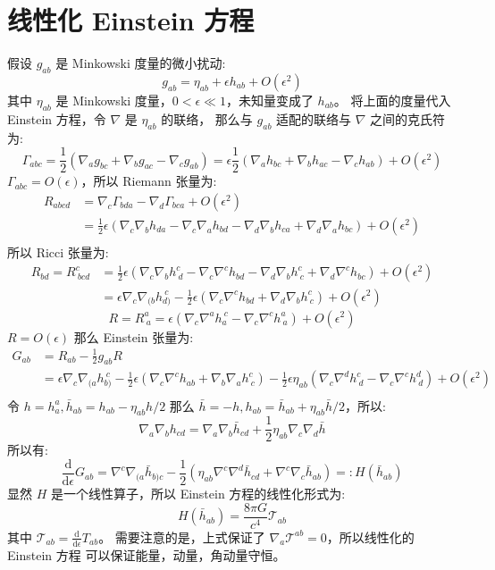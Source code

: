 \documentclass[lang=cn,a4paper,newtx]{elegantpaper}
\begin{document}
\section{线性化 Einstein 方程}
假设 $g_{ab}$ 是 Minkowski 度量的微小扰动:
$$
g_{ab} = \eta_{ab} + \epsilon h_{ab} + O(\epsilon^2)
$$
其中 $\eta_{ab}$ 是 Minkowski 度量，$0<\epsilon\ll 1$，未知量变成了 $h_{ab}$。
将上面的度量代入 Einstein 方程，令 $\nabla$ 是 $\eta_{ab}$ 的联络，
那么与 $g_{ab}$ 适配的联络与 $\nabla$ 之间的克氏符为:
$$
\Gamma_{abc} = \frac{1}{2}(\nabla_ag_{bc} + \nabla_bg_{ac} - \nabla_cg_{ab})
= \epsilon\frac{1}{2}(\nabla_ah_{bc} + \nabla_bh_{ac} - \nabla_ch_{ab}) + O(\epsilon^2)
$$
$\Gamma_{abc} = O(\epsilon)$，所以 Riemann 张量为:
$$
\begin{aligned}
R_{abcd} & = \nabla_c\Gamma_{bda} - \nabla_d\Gamma_{bca} + O(\epsilon^2)\\
& = \frac{1}{2} \epsilon(\nabla_c\nabla_bh_{da} - \nabla_c\nabla_ah_{bd} -
\nabla_d\nabla_bh_{ca} + \nabla_d\nabla_ah_{bc}) + O(\epsilon^2)\\
\end{aligned}
$$
所以 Ricci 张量为:
$$
\begin{aligned}
R_{bd} = R^{c}_{\ bcd} & = \frac{1}{2}\epsilon(\nabla_c\nabla_bh^{c}_{\ d} 
- \nabla_c\nabla^ch_{bd} - \nabla_d\nabla_bh^{c}_{\ c} + \nabla_d\nabla^ch_{bc}) + O(\epsilon^2)\\
& = \epsilon\nabla_c\nabla_{(b}h^{\ c}_{d)} - 
\frac{1}{2}\epsilon(\nabla_c\nabla^ch_{bd} + \nabla_d\nabla_b h^c_{\ c}) + 
O(\epsilon^2)
\end{aligned}
$$
$$
R = R^{a}_{\ a} = \epsilon(\nabla_c\nabla^ah^{\ c}_{a} - \nabla_c\nabla^ch^{a}_{\ a}) + O(\epsilon^2)
$$
$R = O(\epsilon)$ 那么 Einstein 张量为:
$$
\begin{aligned}
G_{ab} & = R_{ab} - \frac{1}{2}g_{ab}R\\
& = \epsilon\nabla_c\nabla_{(a}h^{\ c}_{b)} 
- \frac{1}{2}\epsilon(\nabla_c\nabla^ch_{ab} 
+ \nabla_b\nabla_a h^c_{\ c}) - \frac{1}{2}\epsilon\eta_{ab}( \nabla_c\nabla^dh^{c}_{\ d} - \nabla_c\nabla^ch^{d}_{\ d})
+ O(\epsilon^2)\\ 
\end{aligned}
$$
令 $h = h^a_a, \bar{h}_{ab} = h_{ab} - \eta_{ab} h/2$ 那么 $\bar{h} = -h, 
h_{ab} = \bar{h}_{ab} + \eta_{ab}\bar{h}/2$，所以:
$$
\nabla_{a}\nabla_{b} h_{cd} = \nabla_{a}\nabla_{b} \bar{h}_{cd} + \frac{1}{2}\eta_{ab}\nabla_{c}\nabla_{d}\bar{h}
$$
所以有:
$$
\frac{\mathrm{d}}{\mathrm{d}\epsilon}G_{ab} = \nabla^c\nabla_{(a}\bar{h}_{b)c} - 
\frac{1}{2}(\eta_{ab}\nabla^c\nabla^d\bar{h}_{cd} + \nabla^c\nabla_c\bar{h}_{ab})
=: H(\bar{h}_{ab})
$$
显然 $H$ 是一个线性算子，所以 Einstein 方程的线性化形式为:
$$
H(\bar{h}_{ab}) = \frac{8\pi G}{c^4}\mathcal{T}_{ab}
$$
其中 $\mathcal{T}_{ab} = \frac{\mathrm{d}}{\mathrm{d}\epsilon}T_{ab}$。
需要注意的是，上式保证了 $\nabla_a\mathcal{T}^{ab} = 0$，所以线性化的 Einstein 方程
可以保证能量，动量，角动量守恒。
\end{document}
